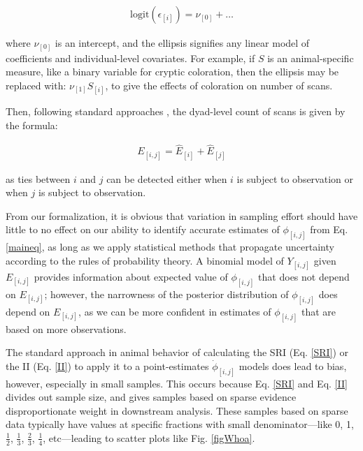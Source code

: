 \documentclass[Afour,sageh,times]{sagej}
\begin{document}
\begin{ceqn}
\begin{align}\label{eq2b}
\text{logit}(\epsilon_{[i]}) = \nu_{[0]} + \ldots 
\end{align}
\end{ceqn}
where $\nu_{[0]}$ is an intercept, and the ellipsis signifies any linear model of coefficients and individual-level covariates. For example, if $S$ is an animal-specific measure, like a binary variable for cryptic coloration, then the ellipsis  may be replaced with:  $\nu_{[1]}S_{[i]}$, to give the effects of coloration on number of scans. 

Then, following standard approaches \citep[e.g.,][]{Farine2015a}, the dyad-level count of scans is given by the formula:
\begin{ceqn}
\begin{align}\label{eq2c}
E_{[i,j]} = \hat E_{[i]} + \hat E_{[j]} 
\end{align}
\end{ceqn}
as ties between $i$ and $j$ can be detected either when $i$ is subject to observation or when $j$ is subject to observation.

From our formalization, it is obvious that variation in sampling effort should have little to no effect on our ability to identify accurate estimates of $\phi_{[i,j]}$ from Eq. \ref{maineq}, as long as we apply statistical methods that propagate uncertainty according to the rules of probability theory. A binomial model of $Y_{[i,j]}$ given $E_{[i,j]}$ provides information about expected value of $\phi_{[i,j]}$ that does not depend on $E_{[i,j]}$; however, the narrowness of the posterior distribution of $\phi_{[i,j]}$ does depend on $E_{[i,j]}$, as we can be more confident in estimates of $\phi_{[i,j]}$ that are based on more observations.

The standard approach in animal behavior of calculating the SRI (Eq. \ref{SRI}) or the II (Eq. \ref{II}) to apply it to a point-estimates $\dot\phi_{[i,j]}$ models does lead to bias, however, especially in small samples. This occurs because Eq. \ref{SRI} and Eq. \ref{II} divides out sample size, and gives samples based on sparse evidence disproportionate weight in downstream analysis. These samples based on sparse data typically have values at specific fractions with small denominator---like 0, 1, $\tfrac{1}{2}$, $\tfrac{1}{3}$, $\tfrac{2}{3}$, $\tfrac{1}{4}$, etc---leading to scatter plots like Fig. \ref{figWhoa}.
\end{document}
